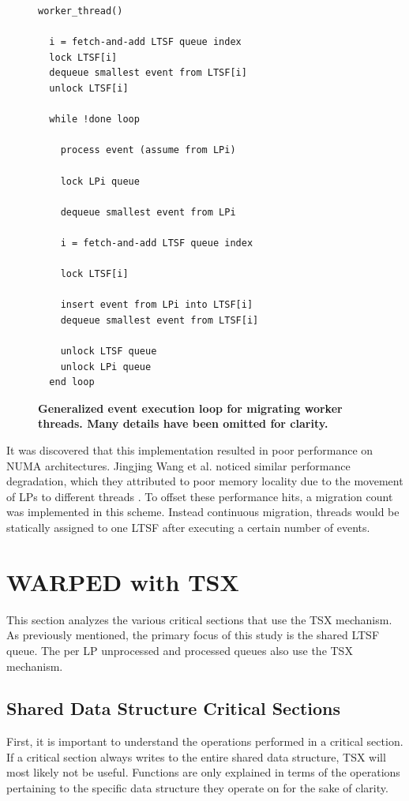 \documentclass[a4paper]{article}
\begin{document}
\linespread{1.0}
\begin{figure}
\begin{verbatim}
worker_thread()

  i = fetch-and-add LTSF queue index
  lock LTSF[i]
  dequeue smallest event from LTSF[i]
  unlock LTSF[i]

  while !done loop

    process event (assume from LPi)

    lock LPi queue
    
    dequeue smallest event from LPi

    i = fetch-and-add LTSF queue index

    lock LTSF[i]

    insert event from LPi into LTSF[i]
    dequeue smallest event from LTSF[i]

    unlock LTSF queue
    unlock LPi queue
  end loop
\end{verbatim}
\linespread{2.0}
\caption{\textbf{Generalized event execution loop for migrating worker threads.  Many details
have been omitted for clarity.}}\label{migratinWorkerThreadAlgorithm}
\end{figure}

It was discovered that this implementation resulted in poor performance on NUMA
architectures.  Jingjing Wang et al. noticed similar performance degradation,
which they attributed to poor memory locality due to the movement of LPs to
different threads \cite{numa}.  To offset these performance hits, a migration
count was implemented in this scheme.  Instead continuous migration, threads
would be statically assigned to one LTSF after executing a certain number of
events.

\newpage
\section{\textbf{WARPED with TSX}}

This section analyzes the various critical sections that use the TSX mechanism.
As previously mentioned, the primary focus of this study is the shared LTSF
queue.  The per LP unprocessed and processed queues also use the TSX mechanism.
\par

\subsection{\textbf{Shared Data Structure Critical Sections}}

First, it is important to understand the operations performed in a critical
section.  If a critical section always writes to the entire shared data
structure, TSX will most likely not be useful.  Functions are only explained in
terms of the operations pertaining to the specific data structure they operate
on for the sake of clarity.  
\par
\end{document}
